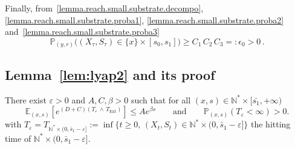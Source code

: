 \documentclass[AHL,Unicode,longabstracts,published]{cedram}
\newcommand{\PP}{\mathbb{P}}
\newcommand{\NN}{\mathbb{N}}
\newcommand{\EE}{\mathbb{E}}
\newcommand{\Text}{T_{\mathrm{Ext}}}
\newcommand{\1}{\mathbf{1}}
\begin{document}
Finally, from~\eqref{lemma.reach.small.substrate.decompo}, \eqref{lemma.reach.small.substrate.proba1}, \eqref{lemma.reach.small.substrate.proba2} and~\eqref{lemma.reach.small.substrate.proba3}
\[
\PP_{(y,r)}\big((X_\tau,S_\tau)\in\{x\}\times [s_0,s_1]\big)
\geq C_1\,C_2\,C_3=:\epsilon_0>0\,.
\]



\subsection{ Lemma~\ref{lem:lyap2} and its proof}



\begin{lemm}\label{lem:lyap2}
There exist $\varepsilon>0$ and $A,C, \beta>0$ such that for all $(x,s) \in \NN^* \times [\bar{s_1}, +\infty)$
\[
\EE_{(x,s)}\left[e^{(D+C)(T_\varepsilon\,\wedge\,\Text)} \right] \leq A e^{\beta s} \qquad
\text{and} \qquad
\PP_{(x,s)}(T_\varepsilon<\infty)>0.
\]
with $T_\varepsilon=T_{ \NN^*\times (0,\bar s_1-\varepsilon]}:=\inf\{t\geq 0, \, (X_t,S_t)\in \NN^*\times (0,\bar s_1-\varepsilon]\}$ the hitting time of $\NN^*\times (0,\bar s_1-\varepsilon]$.
\end{lemm}
\end{document}
